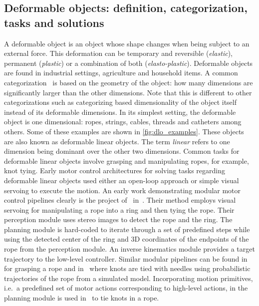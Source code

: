 \subsection{Deformable objects: definition, categorization, tasks and solutions}
A deformable object is an object whose shape changes when being subject to an external force. This deformation can be temporary and reversible (\textit{elastic}), permanent (\textit{plastic}) or a combination of both (\textit{elasto-plastic}). Deformable objects are found in industrial settings, agriculture and household items. A common categorization~\autocite{Saadat2002,Jimenez2012} is based on the geometry of the object: how many dimensions are significantly larger than the other dimensions. Note that this is different to other categorizations such as categorizing based dimensionality of the object itself instead of its deformable dimensions.
In its simplest setting, the deformable object is one dimensional: ropes, strings, cables, threads and catheters among others. Some of these examples are shown in \cref{fig:dlo_examples}. These objects are also known as deformable linear objects. The term \textit{linear} refers to one dimension being dominant over the other two dimensions. Common tasks for deformable linear objects involve grasping and manipulating ropes, for example, knot tying. Early motor control architectures for solving tasks regarding deformable linear objects used either an open-loop approach or simple visual servoing to execute the motion. An early work demonstrating modular motor control pipelines clearly is the project of~\citeauthor{Inaba1987} in~\citeyear{Inaba1987}. Their method employs visual servoing for manipulating a rope into a ring and then tying the rope. Their perception module uses stereo images to detect the rope and the ring. The planning module is hard-coded to iterate through a set of predefined steps while using the detected center of the ring and 3D coordinates of the endpoints of the rope from the perception module. An inverse kinematics module provides a target trajectory to the low-level controller. Similar modular pipelines can be found in~\autocite{Remde1999} for grasping a rope and in~\autocite{Saha2007} where knots are tied with needles using probabilistic trajectories of the rope from a simulated model. Incorporating motion primitives, i.e.\ a predefined set of motor actions corresponding to high-level actions, in the planning module is used in~\autocite{Yamakawa2008, Vinh2012} to tie knots in a rope.


